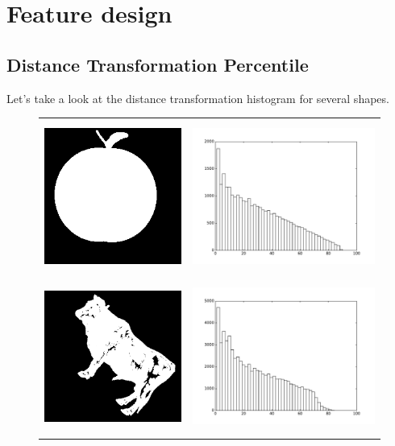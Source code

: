 \documentclass[a4paper, 11pt]{article}
\begin{document}
\newpage
\section{Feature design}

\subsection{Distance Transformation Percentile}
Let's take a look at the distance transformation histogram for several shapes.
\begin{figure}[h!]
\centering
\begin{tabular}{ll}
\includegraphics[width=5cm]{apple.png} &
\includegraphics[height=5cm]{apple-dthist.pdf} \\
\includegraphics[width=5cm]{cattle.png} &
\includegraphics[height=5cm]{cattle-dthist.pdf} \\

\end{tabular}
\end{figure}
\end{document}
